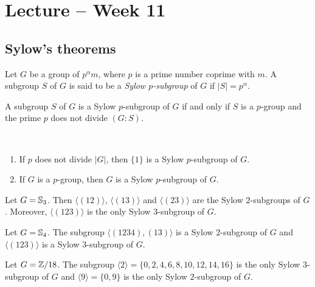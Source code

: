 \section{Lecture -- Week 11}


\subsection{Sylow's theorems}

\begin{definition}
Let $G$ be a group of $p^\alpha m$, where $p$ is a prime number
coprime with $m$. A subgroup $S$ of $G$ is said to be a \emph{Sylow $p$-subgroup} of $G$ if $|S|=p^\alpha$.
\end{definition}

A subgroup $S$ of $G$ is a Sylow 
$p$-subgroup of $G$ if and only if $S$ is a $p$-group and
the prime $p$ does not divide $(G:S)$.

\begin{example}\
\begin{enumerate}
\item If $p$ does not divide $|G|$, then $\{1\}$ is a 
Sylow $p$-subgroup of $G$.
\item If $G$ is a $p$-group, then $G$ is a Sylow
$p$-subgroup of $G$.
\end{enumerate}
\end{example}

\begin{example}
Let $G=\mathbb{S}_3$. Then $\langle (12)\rangle$, $\langle (13)\rangle$ and $\langle (23)\rangle$ are the Sylow $2$-subgroups of $G$. Moreover, 
$\langle (123)\rangle$ is the only Sylow $3$-subgroup of $G$.
\end{example}

\begin{example}
Let $G=\mathbb{S}_4$. The subgroup $\langle (1234),(13)\rangle$ is a Sylow $2$-subgroup of $G$ and 
$\langle (123)\rangle$ is a Sylow $3$-subgroup of $G$.
\end{example}

\begin{example}
Let $G=\mathbb{Z}/18$. The subgroup 
$\langle 2\rangle =\{0,2,4,6,8,10,12,14,16\}$ is the only Sylow $3$-subgroup of $G$ and $\langle 9\rangle=\{0,9\}$ is the only
Sylow $2$-subgroup of $G$.
\end{example}


